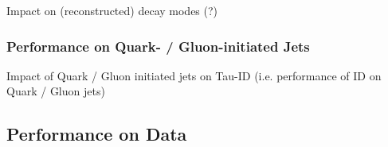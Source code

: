 
Impact on (reconstructed) decay modes (?)



\subsubsection{Performance on Quark- / Gluon-initiated Jets}
\label{sec:bdt_perf_quark_gluon}

Impact of Quark / Gluon initiated jets on Tau-ID (i.e. performance of ID
on Quark / Gluon jets)


\subsection{Performance on Data}
\label{sec:bdt_perf_data}


